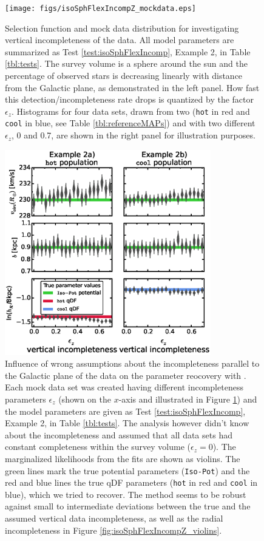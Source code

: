 \begin{figure}
\centering
\begin{minipage}{.48\textwidth}
  \centering
\texttt{[image: figs/isoSphFlexIncompZ\_mockdata.eps]}
\caption{Selection function and mock data distribution for investigating vertical incompleteness of the data. All model parameters are summarized as Test \ref{test:isoSphFlexIncomp}, Example 2, in Table \ref{tbl:tests}. The survey volume is a sphere around the sun and the percentage of observed stars is decreasing linearly with distance from the Galactic plane, as demonstrated in the left panel. How fast this detection/incompleteness rate drops is quantized by the factor $\epsilon_z$. Histograms for four data sets, drawn from two \MAPs{} (\texttt{hot} in red and \texttt{cool} in blue, see Table \ref{tbl:referenceMAPs}) and with two different $\epsilon_z$, 0 and 0.7, are shown in the right panel for illustration purposes. } 
\label{fig:isoSphFlexIncompZ_mockdata}
\end{minipage}%
\begin{minipage}{.48\textwidth}
  \centering
\includegraphics[width=0.8\textwidth]{figs/isoSphFlexIncompZ_violins_2.eps}
\caption{Influence of wrong assumptions about the incompleteness parallel to the Galactic plane of the data on the parameter reocovery with \RM{}. Each mock data set was created having different incompleteness parameters $\epsilon_z$ (shown on the $x$-axis and illustrated in Figure \ref{fig:isoSphFlexIncompZ_mockdata}) and the model parameters are given as Test \ref{test:isoSphFlexIncomp}, Example 2, in Table \ref{tbl:tests}. The analysis however didn't know about the incompleteness and assumed that all data sets had constant completeness within the survey volume ($\epsilon_z = 0$). The marginalized likelihoods from the fits are shown as violins. The green lines mark the true potential parameters (\texttt{Iso-Pot}) and the red and blue lines the true qDF parameters (\texttt{hot} \MAP{} in red and \texttt{cool} \MAP{} in blue), which we tried to recover. The \RM{} method seems to be robust against small to intermediate deviations between the true and the assumed vertical data incompleteness, as well as the radial incompleteness in Figure \ref{fig:isoSphFlexIncompZ_violins}.} 

\end{minipage}
\end{figure}
